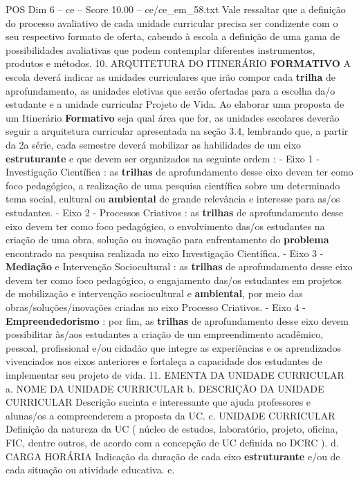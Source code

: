 \begin{textsample}{POS Dim 6 – ce – Score 10.00 – ce/ce\_em\_58.txt}
Vale ressaltar que a definição do processo avaliativo de cada unidade curricular precisa ser condizente com o seu respectivo formato de oferta, cabendo à escola a definição de uma gama de possibilidades avaliativas que podem contemplar diferentes instrumentos, produtos e métodos. 10.
ARQUITETURA DO ITINERÁRIO \textbf{FORMATIVO} A escola deverá indicar as unidades curriculares que irão compor cada \textbf{trilha} de aprofundamento, as unidades eletivas que serão ofertadas para a escolha da/o estudante e a unidade curricular Projeto de Vida.
Ao elaborar uma proposta de um Itinerário \textbf{Formativo} seja qual área que for, as unidades escolares deverão seguir a arquitetura curricular apresentada na seção 3.4, lembrando que, a partir da 2a série, cada semestre deverá mobilizar as habilidades de um eixo \textbf{estruturante} e que devem ser organizados na seguinte ordem : - Eixo 1 - Investigação Científica : as \textbf{trilhas} de aprofundamento desse eixo devem ter como foco pedagógico, a realização de uma pesquisa científica sobre um determinado tema social, cultural ou \textbf{ambiental} de grande relevância e interesse para as/os estudantes. - Eixo 2 - Processos Criativos : as \textbf{trilhas} de aprofundamento desse eixo devem ter como foco pedagógico, o envolvimento das/os estudantes na criação de uma obra, solução ou inovação para enfrentamento do \textbf{problema} encontrado na pesquisa realizada no eixo Investigação Científica. - Eixo 3 - \textbf{Mediação} e Intervenção Sociocultural : as \textbf{trilhas} de aprofundamento desse eixo devem ter como foco pedagógico, o engajamento das/os estudantes em projetos de mobilização e intervenção sociocultural e \textbf{ambiental}, por meio das obras/soluções/inovações criadas no eixo Processo Criativos. - Eixo 4 - \textbf{Empreendedorismo} : por fim, as \textbf{trilhas} de aprofundamento desse eixo devem possibilitar às/aos estudantes a criação de um empreendimento acadêmico, pessoal, profissional e/ou cidadão que integre as experiências e os aprendizados vivenciados nos eixos anteriores e fortaleça a capacidade dos estudantes de implementar seu projeto de vida. 11.
EMENTA DA UNIDADE CURRICULAR a.
NOME DA UNIDADE CURRICULAR b.
DESCRIÇÃO DA UNIDADE CURRICULAR Descrição sucinta e interessante que ajuda professores e alunas/os a compreenderem a proposta da UC. c.
UNIDADE CURRICULAR Definição da natureza da UC ( núcleo de estudos, laboratório, projeto, oficina, FIC, dentre outros, de acordo com a concepção de UC definida no DCRC ). d.
CARGA HORÁRIA Indicação da duração de cada eixo \textbf{estruturante} e/ou de cada situação ou atividade educativa. e.

\end{textsample}

